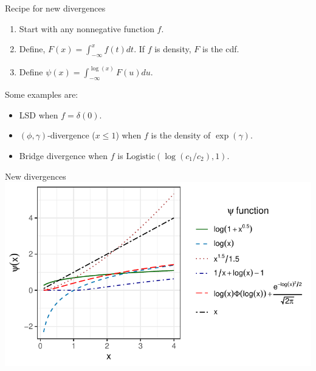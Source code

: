 \documentclass[10pt]{beamer}
\begin{document}
\begin{frame}{Recipe for new divergences}
    \begin{enumerate}
        \item Start with any nonnegative function $f$.
        \item Define, $F(x) = \int_{-\infty}^x f(t)dt$. If $f$ is density, $F$ is the cdf.
        \item Define $\psi(x) = \int_{-\infty}^{\log(x)} F(u)du$.
    \end{enumerate}

    \pause

    Some examples are:
    \begin{itemize}
        \item LSD when $f = \delta(0)$.
        \item $(\phi,\gamma)$-divergence ($x \leq 1$) when $f$ is the density of $\exp(\gamma)$.
        \item Bridge divergence when $f$ is $\text{Logistic}(\log(c_1/c_2), 1)$.
    \end{itemize}

\end{frame}

\begin{frame}{New divergences}
    \includegraphics[width = \textwidth]{./gab-psi-functions.pdf}
\end{frame}
\end{document}

